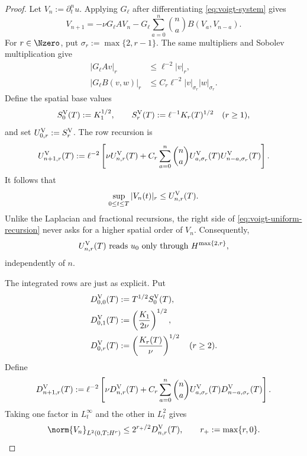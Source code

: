 \begin{proof}
Let \(V_n:=\partial_t^nu\).  Applying \(G_\ell\) after differentiating
\eqref{eq:voigt-system} gives
\begin{equation}
 V_{n+1}
 =-\nu G_\ell AV_n
 -G_\ell\sum_{a=0}^n\binom na B(V_a,V_{n-a}).
 \label{eq:voigt-row-recurrence}
\end{equation}
For \(r\in\Nzero\), put \(\sigma_r:=\max\{2,r-1\}\).  The same multipliers and
Sobolev multiplication give
\begin{align}
 |G_\ell Av|_r&\le\ell^{-2}|v|_r,
 \label{eq:voigt-linear-multiplier}\\
 |G_\ell B(v,w)|_r
 &\le C_r\ell^{-2}|v|_{\sigma_r}|w|_{\sigma_r}.
 \label{eq:voigt-bilinear-multiplier}
\end{align}
Define the spatial base values
\begin{equation}
 S_0^{\rm V}(T):=K_1^{1/2},
 \qquad
 S_r^{\rm V}(T):=\ell^{-1}K_r(T)^{1/2}\quad(r\ge1),
 \label{eq:voigt-spatial-base}
\end{equation}
and set \(U_{0,r}^{\rm V}:=S_r^{\rm V}\).  The row recursion is
\begin{equation}
 U_{n+1,r}^{\rm V}(T)
 :=\ell^{-2}\left[
  \nu U_{n,r}^{\rm V}(T)
  +C_r\sum_{a=0}^n\binom na
    U_{a,\sigma_r}^{\rm V}(T)
    U_{n-a,\sigma_r}^{\rm V}(T)
 \right].
 \label{eq:voigt-uniform-recursion}
\end{equation}
It follows that
\begin{equation}
 \sup_{0\le t\le T}|V_n(t)|_r
 \le U_{n,r}^{\rm V}(T).
 \label{eq:voigt-uniform-row}
\end{equation}
Unlike the Laplacian and fractional recursions, the right side of
\eqref{eq:voigt-uniform-recursion} never asks for a higher spatial order of
\(V_n\).  Consequently,
\begin{equation}
 U_{n,r}^{\rm V}(T)
 \text{ reads }u_0\text{ only through }H^{\max\{2,r\}},
 \label{eq:voigt-row-ledger}
\end{equation}
independently of \(n\).

The integrated rows are just as explicit.  Put
\begin{align}
 D_{0,0}^{\rm V}(T)&:=T^{1/2}S_0^{\rm V}(T),
 \notag\\
 D_{0,1}^{\rm V}(T)&:=\left(\frac{K_1}{2\nu}\right)^{1/2},
 \notag\\
 D_{0,r}^{\rm V}(T)&:=\left(\frac{K_r(T)}{\nu}\right)^{1/2}
 \quad(r\ge2).
 \label{eq:voigt-integrated-base}
\end{align}
Define
\begin{equation}
 D_{n+1,r}^{\rm V}(T)
 :=\ell^{-2}\left[
  \nu D_{n,r}^{\rm V}(T)
  +C_r\sum_{a=0}^n\binom na
    U_{a,\sigma_r}^{\rm V}(T)
    D_{n-a,\sigma_r}^{\rm V}(T)
 \right].
 \label{eq:voigt-integrated-recursion}
\end{equation}
Taking one factor in \(L_t^\infty\) and the other in \(L_t^2\) gives
\begin{equation}
 \norm{V_n}_{L^2(0,T;H^r)}
 \le 2^{r_+/2}D_{n,r}^{\rm V}(T),
 \qquad r_+:=\max\{r,0\}.
 \label{eq:voigt-integrated-row}
\end{equation}


\end{proof}
